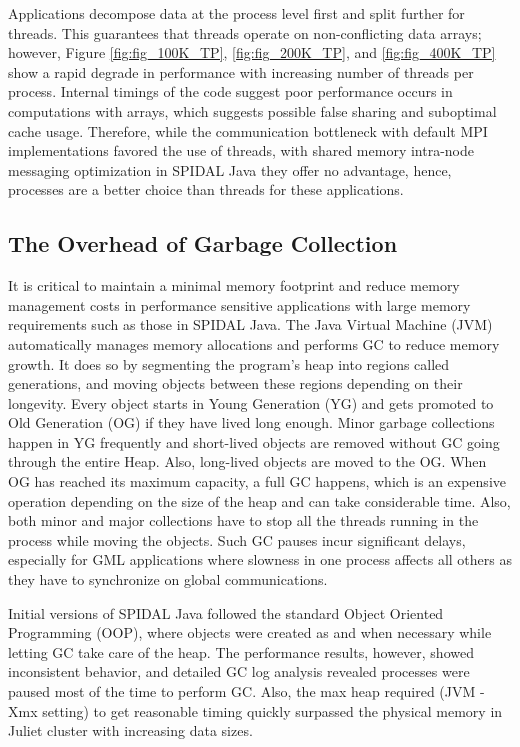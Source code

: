 Applications decompose data at the process level first and split further for threads. This guarantees that threads operate on non-conflicting data arrays; however, Figure \ref{fig:fig_100K_TP}, \ref{fig:fig_200K_TP}, and \ref{fig:fig_400K_TP} show a rapid degrade in performance with increasing number of threads per process. Internal timings of the code suggest poor performance occurs in computations with arrays, which suggests possible false sharing and suboptimal cache usage. Therefore, while the communication bottleneck with default MPI implementations favored the use of threads, with shared memory intra-node messaging optimization in SPIDAL Java they offer no advantage, hence, processes are a better choice than threads for these applications.

\subsection{The Overhead of Garbage Collection}
It is critical to maintain a minimal memory footprint and reduce memory management costs in performance sensitive applications with large memory requirements such as those in SPIDAL Java. The Java Virtual Machine (JVM) automatically manages memory allocations and performs GC to reduce memory growth. It does so by segmenting the program's heap into regions called generations, and moving objects between these regions depending on their longevity. Every object starts in Young Generation (YG) and gets promoted to Old Generation (OG) if they have lived long enough. Minor garbage collections happen in YG frequently and short-lived objects are removed without GC going through the entire Heap. Also, long-lived objects are moved to the OG. When OG has reached its maximum capacity, a full GC happens, which is an expensive operation depending on the size of the heap and can take considerable time. Also, both minor and major collections have to stop all the threads running in the process while moving the objects. Such GC pauses incur significant delays, especially for GML applications where slowness in one process affects all others as they have to synchronize on global communications. 

Initial versions of SPIDAL Java followed the standard Object Oriented Programming (OOP), where objects were created as and when necessary while letting GC take care of the heap. The performance results, however, showed inconsistent behavior, and detailed GC log analysis revealed processes were paused most of the time to perform GC. Also, the max heap required (JVM -Xmx setting) to get reasonable timing quickly surpassed the physical memory in Juliet cluster with increasing data sizes.

